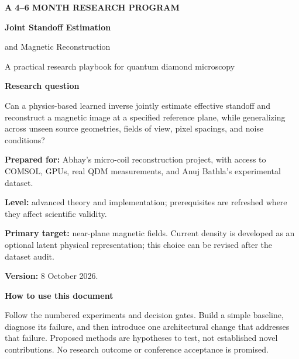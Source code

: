\documentclass[11pt,a4paper]{article}
\begin{document}
\hypersetup{pageanchor=false}
\begin{titlepage}
\vspace*{12mm}
{\small\bfseries\color{teal} A 4--6 MONTH RESEARCH PROGRAM}\par
\vspace{8mm}
{\Huge\bfseries\color{navy} Joint Standoff Estimation\par and Magnetic Reconstruction}\par
\vspace{6mm}
{\Large A practical research playbook for quantum diamond microscopy}\par
\vspace{12mm}
\begin{tcolorbox}
\textbf{Research question}\par
Can a physics-based learned inverse jointly estimate effective standoff and reconstruct a magnetic image at a specified reference plane, while generalizing across unseen source geometries, fields of view, pixel spacings, and noise conditions?
\end{tcolorbox}
\vspace{8mm}
\textbf{Prepared for:} Abhay's micro-coil reconstruction project, with access to COMSOL, GPUs, real QDM measurements, and Anuj Bathla's experimental dataset.\par
\textbf{Level:} advanced theory and implementation; prerequisites are refreshed where they affect scientific validity.\par
\textbf{Primary target:} near-plane magnetic fields. Current density is developed as an optional latent physical representation; this choice can be revised after the dataset audit.\par
\textbf{Version:} 8 October 2026.\par
\vfill
\textbf{How to use this document}\par
Follow the numbered experiments and decision gates. Build a simple baseline, diagnose its failure, and then introduce one architectural change that addresses that failure. Proposed methods are hypotheses to test, not established novel contributions. No research outcome or conference acceptance is promised.
\end{titlepage}
\hypersetup{pageanchor=true}
\tableofcontents
\clearpage
{}







\end{document}
